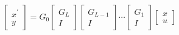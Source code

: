 \documentclass[a4paper,twoside,10pt,english]{report}
\begin{document}
\begin{align*}
\left[\begin{array}{c}
x^{\prime}\\
y
\end{array}\right] = G_{0}
\left[\begin{array}{c}
G_{L}\\
I
\end{array}\right]
\left[\begin{array}{c}
G_{L-1}\\
I 
\end{array}\right]
\cdots
\left[\begin{array}{c}
G_{1}\\
I
\end{array}\right]
\left[\begin{array}{c}
x\\
u
\end{array}\right] 
\end{align*}
\end{document}
